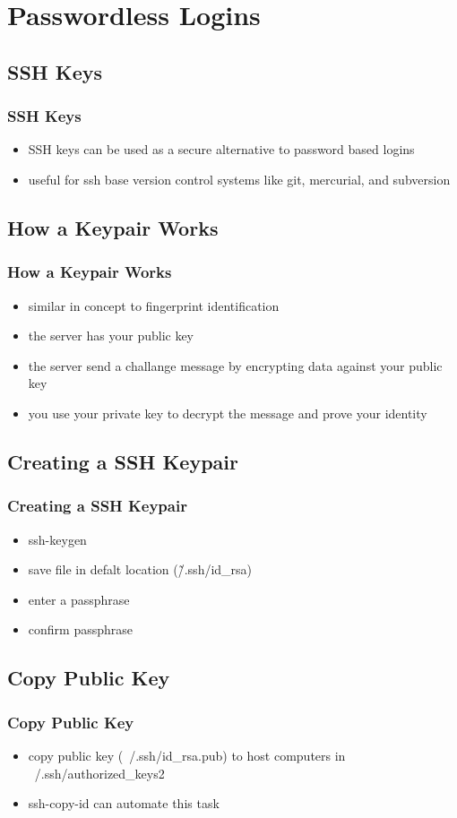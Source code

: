 \documentclass[hyperref={pdfpagelabels=false}]{beamer}
\begin{document}
\section{Passwordless Logins}
\subsection{SSH Keys}
\frame
{
    \frametitle{SSH Keys}
    \begin{itemize}
    \item{SSH keys can be used as a secure alternative to password based logins}
    \item{useful for ssh base version control systems like git, mercurial, and subversion}
    \end{itemize}
}
\subsection{How a Keypair Works}
\frame
{
    \frametitle{How a Keypair Works}
    \begin{itemize}
    \item{similar in concept to fingerprint identification}
    \item{the server has your public key}
    \item{the server send a challange message by encrypting data against your public key}
    \item{you use your private key to decrypt the message and prove your identity}
    \end{itemize}
}
\subsection{Creating a SSH Keypair}
\frame
{
    \frametitle{Creating a SSH Keypair}
    \begin{itemize}
    \item{ssh-keygen}
    \item{save file in defalt location (\~/.ssh/id\_rsa)}
    \item{enter a passphrase}
    \item{confirm passphrase}
    \end{itemize}
}
\subsection{Copy Public Key}
\frame
{
    \frametitle{Copy Public Key}
    \begin{itemize}
    \item{copy public key (~/.ssh/id\_rsa.pub) to host computers in ~/.ssh/authorized\_keys2}
    \item{ssh-copy-id can automate this task}
    \end{itemize}
}
\end{document}
